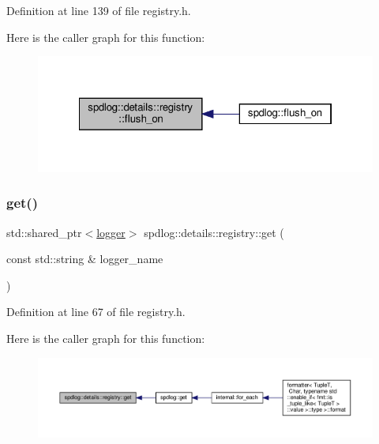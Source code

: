 Definition at line 139 of file registry.\+h.

Here is the caller graph for this function\+:
\nopagebreak
\begin{figure}[H]
\begin{center}
\leavevmode
\includegraphics[width=322pt]{classspdlog_1_1details_1_1registry_a34841160632afca0f2063f1d55629d73_icgraph}
\end{center}
\end{figure}
\mbox{\label{classspdlog_1_1details_1_1registry_a43cb4919dd9f66cf4eeeeaf9774caade}} 
\subsubsection{\texorpdfstring{get()}{get()}}
{\footnotesize\ttfamily std\+::shared\+\_\+ptr$<$\hyperlink{classspdlog_1_1logger}{logger}$>$ spdlog\+::details\+::registry\+::get (\begin{DoxyParamCaption}\item[{const std\+::string \&}]{logger\+\_\+name }\end{DoxyParamCaption})\hspace{0.3cm}{\ttfamily [inline]}}



Definition at line 67 of file registry.\+h.

Here is the caller graph for this function\+:
\nopagebreak
\begin{figure}[H]
\begin{center}
\leavevmode
\includegraphics[width=350pt]{classspdlog_1_1details_1_1registry_a43cb4919dd9f66cf4eeeeaf9774caade_icgraph}
\end{center}
\end{figure}
\mbox{\label{classspdlog_1_1details_1_1registry_a1fd3bc96c2a7be1af1841f5980cd5f4c}} 
